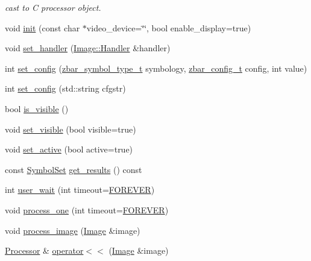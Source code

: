 \begin{DoxyCompactItemize}
\begin{DoxyCompactList}\small\item\em cast to C processor object. \end{DoxyCompactList}\item 
void \hyperlink{classzbar_1_1_processor_afec0a5af072b231545d3bd891d9c305a}{init} (const char $\ast$video\_\-device=\char`\"{}\char`\"{}, bool enable\_\-display=true)
\item 
void \hyperlink{classzbar_1_1_processor_a8995247d233f207fa09b77a30eb2522a}{set\_\-handler} (\hyperlink{classzbar_1_1_image_1_1_handler}{Image::Handler} \&handler)
\item 
int \hyperlink{classzbar_1_1_processor_a460020c86a5ac331506499b3c9e7e4d0}{set\_\-config} (\hyperlink{zbar_8h_a74c1318b082084bdeaa7333b355f3e64}{zbar\_\-symbol\_\-type\_\-t} symbology, \hyperlink{zbar_8h_ae5ca63a2fe9ff3b63fc0d85995935a1d}{zbar\_\-config\_\-t} config, int value)
\item 
int \hyperlink{classzbar_1_1_processor_af47d663d3540b3ee6ac62ceda1ad0b6a}{set\_\-config} (std::string cfgstr)
\item 
bool \hyperlink{classzbar_1_1_processor_a6594a0297d19a49a9ecb976637910d23}{is\_\-visible} ()
\item 
void \hyperlink{classzbar_1_1_processor_aba9747be982c62adebf2907d538036ff}{set\_\-visible} (bool visible=true)
\item 
void \hyperlink{classzbar_1_1_processor_a4d4d90ad39b9ee90d523f5abc582bffb}{set\_\-active} (bool active=true)
\item 
const \hyperlink{classzbar_1_1_symbol_set}{SymbolSet} \hyperlink{classzbar_1_1_processor_a5bf34949e43a7a238dac083b9934d525}{get\_\-results} () const 
\item 
int \hyperlink{classzbar_1_1_processor_aa443d3c45b394eff2a73d8362a2c35dd}{user\_\-wait} (int timeout=\hyperlink{classzbar_1_1_processor_a9d96e94544935aec0f8f975b0ea15a9f}{FOREVER})
\item 
void \hyperlink{classzbar_1_1_processor_a39d1094887b26b95f188c97381cc7161}{process\_\-one} (int timeout=\hyperlink{classzbar_1_1_processor_a9d96e94544935aec0f8f975b0ea15a9f}{FOREVER})
\item 
void \hyperlink{classzbar_1_1_processor_ada537e7ce76cd470c8c80d5ce1e128de}{process\_\-image} (\hyperlink{classzbar_1_1_image}{Image} \&image)
\item 
\hyperlink{classzbar_1_1_processor}{Processor} \& \hyperlink{classzbar_1_1_processor_afcf554ab73b388a38ff7a80e2a3fcf07}{operator$<$$<$} (\hyperlink{classzbar_1_1_image}{Image} \&image)

\end{DoxyCompactItemize}
